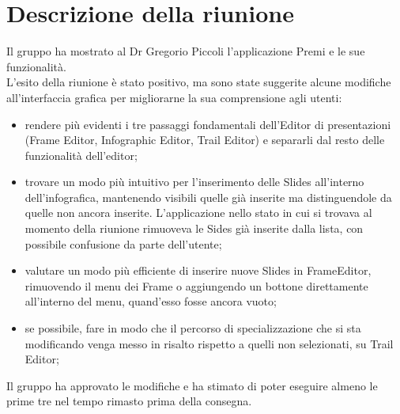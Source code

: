 \section{Descrizione della riunione}
Il gruppo ha mostrato al Dr Gregorio Piccoli l'applicazione Premi e le sue funzionalità. \\
L'esito della riunione è stato positivo, ma sono state suggerite alcune modifiche all'interfaccia grafica per migliorarne la sua comprensione agli utenti:
\begin{itemize}
\item rendere più evidenti i tre passaggi fondamentali dell'Editor di presentazioni (Frame Editor, Infographic Editor, Trail Editor) e separarli dal resto delle funzionalità dell'editor;
\item trovare un modo più intuitivo per l'inserimento delle Slides all'interno dell'infografica, mantenendo visibili quelle già inserite ma distinguendole da quelle non ancora inserite. L'applicazione nello stato in cui si trovava al momento della riunione rimuoveva le Sides già inserite dalla lista, con possibile confusione da parte dell'utente;
\item valutare un modo più efficiente di inserire nuove Slides in FrameEditor, rimuovendo il menu dei Frame o aggiungendo un bottone direttamente all'interno del menu, quand'esso fosse ancora vuoto;
\item se possibile, fare in modo che il percorso di specializzazione che si sta modificando venga messo in risalto rispetto a quelli non selezionati, su Trail Editor;
\end{itemize}
Il gruppo ha approvato le modifiche e ha stimato di poter eseguire almeno le prime tre nel tempo rimasto prima della consegna.